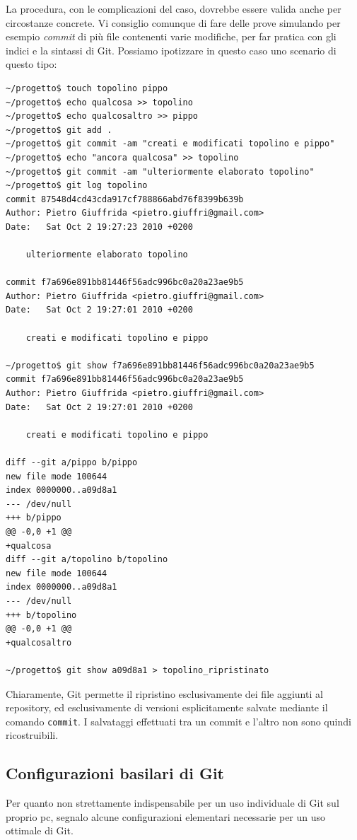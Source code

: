 \documentclass[a4paper,12pt,oneside]{article}
\begin{document}
La procedura, con le complicazioni del caso, dovrebbe essere valida anche per
circostanze concrete. Vi consiglio comunque di fare delle prove simulando per
esempio \emph{commit} di più file contenenti varie modifiche, per far pratica
con gli indici e la sintassi di Git.
Possiamo ipotizzare in questo caso uno scenario di questo tipo:
\begin{lstlisting}
~/progetto$ touch topolino pippo
~/progetto$ echo qualcosa >> topolino
~/progetto$ echo qualcosaltro >> pippo
~/progetto$ git add .
~/progetto$ git commit -am "creati e modificati topolino e pippo"
~/progetto$ echo "ancora qualcosa" >> topolino
~/progetto$ git commit -am "ulteriormente elaborato topolino"
~/progetto$ git log topolino
commit 87548d4cd43cda917cf788866abd76f8399b639b
Author: Pietro Giuffrida <pietro.giuffri@gmail.com>
Date:   Sat Oct 2 19:27:23 2010 +0200

    ulteriormente elaborato topolino

commit f7a696e891bb81446f56adc996bc0a20a23ae9b5
Author: Pietro Giuffrida <pietro.giuffri@gmail.com>
Date:   Sat Oct 2 19:27:01 2010 +0200

    creati e modificati topolino e pippo

~/progetto$ git show f7a696e891bb81446f56adc996bc0a20a23ae9b5
commit f7a696e891bb81446f56adc996bc0a20a23ae9b5
Author: Pietro Giuffrida <pietro.giuffri@gmail.com>
Date:   Sat Oct 2 19:27:01 2010 +0200

    creati e modificati topolino e pippo

diff --git a/pippo b/pippo
new file mode 100644
index 0000000..a09d8a1
--- /dev/null
+++ b/pippo
@@ -0,0 +1 @@
+qualcosa
diff --git a/topolino b/topolino
new file mode 100644
index 0000000..a09d8a1
--- /dev/null
+++ b/topolino
@@ -0,0 +1 @@
+qualcosaltro

~/progetto$ git show a09d8a1 > topolino_ripristinato
\end{lstlisting}

Chiaramente, Git permette il ripristino esclusivamente dei file aggiunti al
repository, ed esclusivamente di versioni esplicitamente salvate mediante il
comando \lstinline|commit|. I salvataggi effettuati tra un commit e l'altro non
sono quindi ricostruibili.

\subsection{Configurazioni basilari di Git}
Per quanto non strettamente indispensabile per un uso individuale di Git sul
proprio pc, segnalo alcune configurazioni elementari necessarie per un uso
ottimale di Git.
\end{document}
